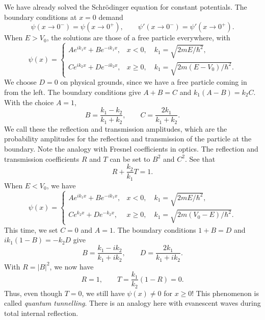 \documentclass[11pt]{article}
\theoremstyle{definition}
\theoremstyle{remark}
\numberwithin{equation}{section}
\begin{document}
    We have already solved the Schr\"odinger equation for constant potentials. The
    boundary conditions at $x = 0$ demand \[
        \psi(x \to 0^-) = \psi(x \to 0^+), \qquad
        \psi'(x \to 0^-) = \psi'(x \to 0^+).
    \] When $E > V_0$, the solutions are those of a free particle everywhere, with
    \[
        \psi(x) = \begin{cases}
            Ae^{ik_1x} + Be^{-ik_1x}, & x < 0, \quad k_1 = \sqrt{2mE / \hbar^2}, \\
            Ce^{ik_2x} + De^{-ik_2x}, & x \geq 0, \quad k_1 = \sqrt{2m(E - V_0) /
            \hbar^2}.
        \end{cases}
    \] We choose $D = 0$ on physical grounds, since we have a free particle coming
    in from the left. The boundary conditions give $A + B = C$ and $k_1(A - B) =
    k_2C$. With the choice $A = 1$, \[
        B = \frac{k_1 - k_2}{k_1 + k_2}, \qquad C = \frac{2k_1}{k_1 + k_2}.
    \] We call these the reflection and transmission amplitudes, which are the
    probability amplitudes for the reflection and transmission of the particle at
    the boundary. Note the analogy with Fresnel coefficients in optics.
    The reflection and transmission coefficients $R$ and $T$ can be set to $B^2$ and
    $C^2$. See that \[
        R + \frac{k_2}{k_1}T = 1.
    \] When $E < V_0$, we have \[
        \psi(x) = \begin{cases}
            Ae^{ik_1x} + Be^{-ik_1x}, & x < 0, \quad k_1 = \sqrt{2mE / \hbar^2}, \\
            Ce^{k_2x} + De^{-k_2x}, & x \geq 0, \quad k_1 = \sqrt{2m(V_0 - E) /
            \hbar^2}.
        \end{cases}
    \] This time, we set $C = 0$ and $A = 1$. The boundary conditions $1 + B = D$
    and $ik_1(1 - B) = -k_2D$ give \[
        B = \frac{k_1 - ik_2}{k_1 + ik_2}, \qquad D = \frac{2k_1}{k_1 + ik_2}.
    \] With $R = |B|^2$, we now have \[
        R = 1, \qquad T = \frac{k_1}{k_2}(1 - R) = 0.
    \] Thus, even though $T = 0$, we still have $\psi(x) \neq 0$ for $x \geq 0$!
    This phenomenon is called \textit{quantum tunnelling}.
    There is an analogy here with evanescent waves during total internal reflection.
\end{document}
